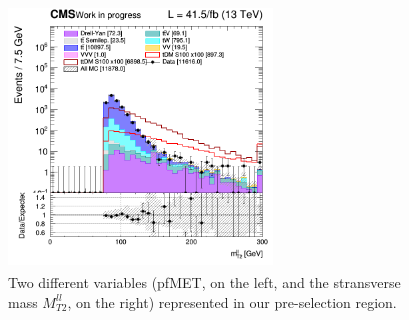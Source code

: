\documentclass[a4paper, 10pt, openright]{report}
\begin{document}
\begin{figure}[htbp]
{\begin{minipage}[b]{.48\textwidth}
\end{minipage}\hfill
\begin{minipage}[b]{.48\textwidth}
\includegraphics[width=7cm, height=7cm]{figs/2017/SmearSR-ttDM-scalar100/log_cratio_topCR_ll_mt2ll.png}
\end{minipage} \hfill
}
\caption{Two different variables (pf\ac{MET}, on the left, and the stransverse mass $M_{T2}^{ll}$, on the right) represented in our pre-selection region.}
\label{fig:preSelSR}
\end{figure}
\end{document}
